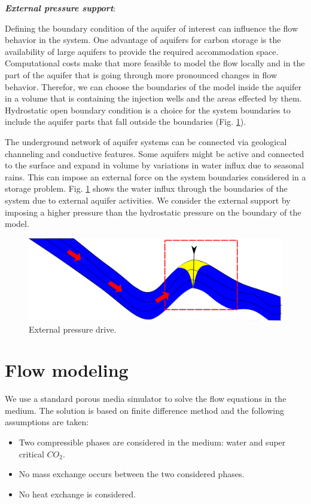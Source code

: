 \textbf{\textit{External pressure support}}:

Defining the boundary condition of the aquifer of interest can influence the flow behavior in the system. One advantage of aquifers for carbon storage is the availability of large aquifers to provide the required accommodation space. Computational costs make that more feasible to model the flow locally and in the part of the aquifer that is going through more pronounced changes in flow behavior. Therefor, we can choose the boundaries of the model inside the aquifer in a volume that is containing the injection wells and the areas effected by them. Hydrostatic open boundary condition is a choice for the system boundaries to include the aquifer parts that fall outside the boundaries (Fig. \ref{fig:bkw}).

The underground network of aquifer systems can be connected via geological channeling and conductive features. Some aquifers might be active and connected to the surface and expand in volume by variations in water influx due to  seasonal rains. This can impose an external force on the system boundaries considered in a storage problem. Fig. \ref{fig:bkw} shows the water influx through the boundaries of the system due to external aquifer activities. We consider the external support by imposing a higher pressure than the hydrostatic pressure on the boundary of the model.

\begin{figure}[thb]
  \centering
  \includegraphics[width=0.65 \linewidth]{./figurer/bkw} 
  \caption{External pressure drive.}
  \label{fig:bkw}
%
\end{figure}


\section{Flow modeling}

We use a standard porous media simulator to solve the flow equations in the medium. The solution is based on finite difference method and the following assumptions are taken:

\begin{itemize}

  \item Two compressible phases are considered in the medium: water and super critical ${CO}_2$.
  \item No mass exchange occurs between the two considered phases.
  \item No heat exchange is considered.

\end{itemize}

